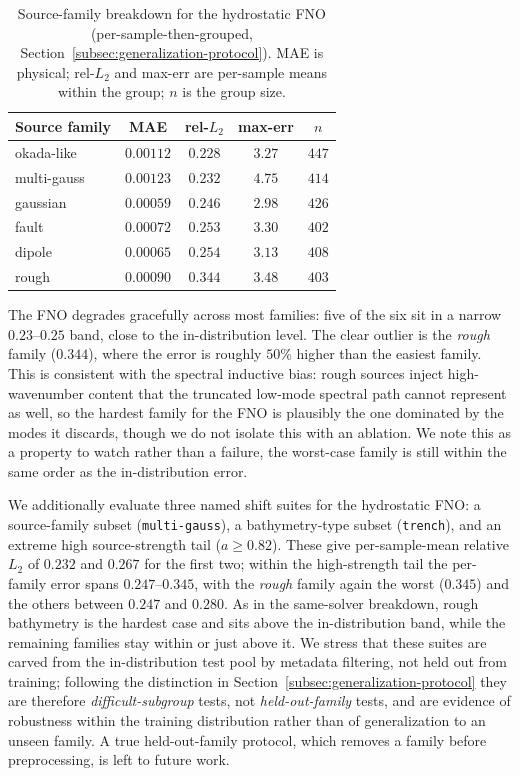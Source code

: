 \begin{table}[!htbp]
\centering
\caption{Source-family breakdown for the hydrostatic FNO (per-sample-then-grouped, Section~\ref{subsec:generalization-protocol}). MAE is physical; rel-$L_2$ and max-err are per-sample means within the group; $n$ is the group size.}
\label{tab:ood}
\begin{tabular}{lcccc}
    \toprule
    Source family & MAE & rel-$L_2$ & max-err & $n$ \\
    \midrule
    okada-like  & $0.00112$ & $0.228$ & $3.27$ & $447$ \\
    multi-gauss & $0.00123$ & $0.232$ & $4.75$ & $414$ \\
    gaussian    & $0.00059$ & $0.246$ & $2.98$ & $426$ \\
    fault       & $0.00072$ & $0.253$ & $3.30$ & $402$ \\
    dipole      & $0.00065$ & $0.254$ & $3.13$ & $408$ \\
    rough       & $0.00090$ & $\mathbf{0.344}$ & $3.48$ & $403$ \\
    \bottomrule
\end{tabular}
\end{table}

The FNO degrades gracefully across most families: five of the six sit in a narrow $0.23$--$0.25$ band, close to the in-distribution level. The clear outlier is the \emph{rough} family ($0.344$), where the error is roughly $50\%$ higher than the easiest family. This is consistent with the spectral inductive bias: rough sources inject high-wavenumber content that the truncated low-mode spectral path cannot represent as well, so the hardest family for the FNO is plausibly the one dominated by the modes it discards, though we do not isolate this with an ablation. We note this as a property to watch rather than a failure, the worst-case family is still within the same order as the in-distribution error.

We additionally evaluate three named shift suites for the hydrostatic FNO: a source-family subset (\texttt{multi-gauss}), a bathymetry-type subset (\texttt{trench}), and an extreme high source-strength tail ($a \ge 0.82$). These give per-sample-mean relative $L_2$ of $0.232$ and $0.267$ for the first two; within the high-strength tail the per-family error spans $0.247$--$0.345$, with the \emph{rough} family again the worst ($0.345$) and the others between $0.247$ and $0.280$. As in the same-solver breakdown, rough bathymetry is the hardest case and sits above the in-distribution band, while the remaining families stay within or just above it. We stress that these suites are carved from the in-distribution test pool by metadata filtering, not held out from training; following the distinction in Section~\ref{subsec:generalization-protocol} they are therefore \emph{difficult-subgroup} tests, not \emph{held-out-family} tests, and are evidence of robustness within the training distribution rather than of generalization to an unseen family. A true held-out-family protocol, which removes a family before preprocessing, is left to future work.

